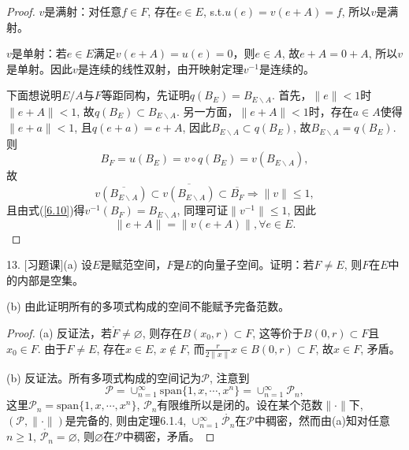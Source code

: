 \documentclass[a4paper,8pt]{ctexart}\textwidth 140mm \textheight 216mm
\newcommand{\8}{\infty}
\newcommand{\RA}{\Rightarrow}
\begin{document}
\begin{proof}
	$v$是满射：对任意$f\in F$, 存在$e\in E$, s.t.$u(e)=v(e+A)=f$, 所以$v$是满射。
	
	$v$是单射：若$e\in E$满足$v(e+A)=u(e)=0$，则$e\in A$, 故$e+A=0+A$, 所以$v$是单射。因此$v$是连续的线性双射，由开映射定理$v^{-1}$是连续的。
	
	下面想说明$E/A$与$F$等距同构，先证明$q(B_E)=B_{E\backslash A}$.  首先，$\|e\|<1$时$\|e+A\|<1$, 故$q(B_E)\subset B_{E\backslash A}$. 另一方面，$\|e+A\|<1$时，存在$a\in A$使得$\|e+a\|<1$, 且$q(e+a)=e+A$, 因此$B_{E\backslash A}\subset q(B_E)$, 故$B_{E\backslash A}=q(B_E)$. 则
	\begin{equation}\label{6.10}
	B_F=u(B_E)=v\circ q(B_E)=v(B_{E\backslash A}),
	\end{equation}
	故
	$$v(\overline{B_{E\backslash A}})\subset \overline{v(B_{E\backslash A})}\subset \overline{B_F}\RA \|v\|\leq 1,$$
	且由式(\ref{6.10})得$v^{-1}(B_F)=B_{E\backslash A}$, 同理可证$\|v^{-1}\|\leq 1$, 因此
	$$\|e+A\|= \|v(e+A)\|,\forall e\in E.$$
\end{proof}

13. [习题课](a) 设$E$是赋范空间，$F$是$E$的向量子空间。证明：若$F\ne E$, 则$F$在$E$中的内部是空集。

(b) 由此证明所有的多项式构成的空间不能赋予完备范数。
\begin{proof}
	(a) 反证法，若$\mathring{F}\ne \varnothing$, 则存在$B(x_0,r)\subset F$, 这等价于$B(0,r)\subset F$且$x_0\in F$. 由于$F\ne E$, 存在$x\in E$, $x\notin F$, 而$\frac{r}{2\|x\|}x\in B(0,r)\subset F$, 故$x\in F$, 矛盾。
	
	(b) 反证法。所有多项式构成的空间记为$\mathcal{P}$, 注意到
	$$\mathcal{P}=\cup_{n=1}^\infty \mathrm{span}\{ 1,x,\cdots,x^n\}=\cup_{n=1}^\infty \mathcal{P}_n,$$
	这里$\mathcal{P}_n=\mathrm{span}\{ 1,x,\cdots,x^n\}$, $\mathcal{P}_n$有限维所以是闭的。设在某个范数$\|\cdot\|$下, $(\mathcal{P},\|\cdot\|)$是完备的, 则由定理6.1.4, $\cup_{n=1}^\infty \mathring{\mathcal{P}_n}$在$\mathcal{P}$中稠密，然而由(a)知对任意$n\geq 1$, $\mathring{\mathcal{P}_n}=\varnothing$, 则$\varnothing$在$\mathcal{P}$中稠密，矛盾。
\end{proof}
\end{document}
